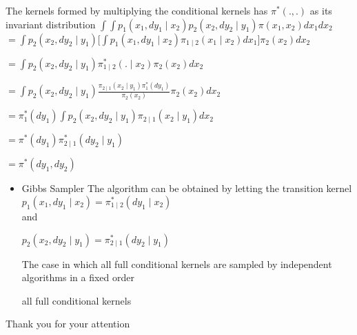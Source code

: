 \documentclass[hyperref={pdfpagelabels=false}]{beamer}
\begin{document}
\begin{frame}
The kernels formed by multiplying the conditional kernels has $\pi^{*}(.,.)$ as its invariant distribution
$\int \int p_{1}(x_{1},dy_{1}\mid x_{2})p_{2}(x_{2},dy_{2}\mid y_{1})\pi(x_{1},x_{2})dx_{1}dx_{2}$
$=\int p_{2}(x_{2},dy_{2}\mid y_{1})\bigg[   \int p_{1}(x_{1},dy_{1}\mid x_{2}) \pi_{1 \mid 2}(x_{1}\mid x_{2})dx_{1} \bigg] \pi_{2}(x_{2})dx_{2}$

$=\int p_{2}(x_{2},dy_{2}\mid y_{1})\pi_{1 \mid 2}^{*}(.\mid x_{2})\pi_{2}(x_{2})dx_{2}$

$=\int p_{2}(x_{2},dy_{2}\mid y_{1})\frac{\pi_{2 \mid 1}(x_{2}\mid y_{1})\pi_{1 }^{*}(dy_{1})}{\pi_{2}(x_{2})}\pi_{2}(x_{2})dx_{2}$


$= \pi_{1}^{*}(dy_{1}) \int p_{2}(x_{2},dy_{2}\mid y_{1}) \pi_{2 \mid 1}(x_{2}\mid y_{1})dx_{2}$


$=\pi^{*}(dy_{1})\pi_{2 \mid 1}^{*}(dy_{2} \mid y_{1})$

$=\pi^{*}(dy_{1},dy_{2})$

\end{frame}



\begin{frame}
\begin{itemize}

\item Gibbs Sampler
The algorithm can be obtained by letting the transition  kernel\\
$p_{1}(x_{1},dy_{1}\mid x_{2})=\pi _{1 \mid 2}^{*}(dy_{1} \mid x_{2})$\\

and



$p_{2}(x_{2},dy_{2}\mid y_{1})=\pi _{2 \mid 1}^{*}(dy_{2} \mid y_{1})$ \\
\vspace{3mm}

The case in which all full conditional  kernels are sampled by independent algorithms
in a fixed order

all full conditional kernels 
\end{itemize}

\end{frame}


\begin{frame}
Thank you for your attention
\end{frame}
\end{document}
